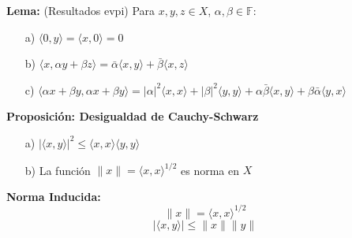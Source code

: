 \documentclass{article}
\begin{document}
\textbf{Lema:} (Resultados evpi) Para $x, y, z \in X$, $\alpha, \beta \in \mathbb{F}$:
\begin{itemize}
    \item[a)] $\langle 0, y \rangle = \langle x, 0 \rangle = 0$
    \item[b)] $\langle x, \alpha y + \beta z \rangle = \bar{\alpha} \langle x, y \rangle + \bar{\beta} \langle x, z \rangle$
    \item[c)]
    $\langle \alpha x + \beta y, \alpha x + \beta y \rangle = |\alpha|^2 \langle x, x \rangle + |\beta|^2 \langle y, y \rangle + \alpha \bar{\beta} \langle x, y \rangle + \beta \bar{\alpha} \langle y, x \rangle$
\end{itemize}

\textbf{Proposición: Desigualdad de Cauchy-Schwarz}
\begin{itemize}
    \item[a)] $|\langle x, y \rangle|^2 \le \langle x, x \rangle \langle y, y \rangle$
    \item[b)] La función $\|x\| = \langle x, x \rangle^{1/2}$ es norma en $X$
\end{itemize}

\textbf{Norma Inducida:}
\[
\|x\| = \langle x, x \rangle^{1/2}
\]
\[
|\langle x, y \rangle| \le \|x\| \|y\|
\]

\end{document}
